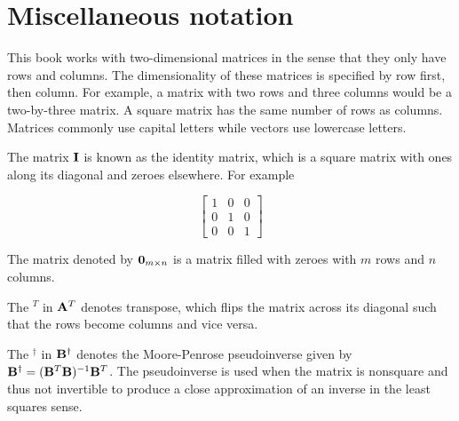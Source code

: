 \section{Miscellaneous notation}

This book works with two-dimensional matrices in the sense that they only have
rows and columns. The dimensionality of these matrices is specified by row
first, then column. For example, a matrix with two rows and three columns would
be a two-by-three matrix. A square matrix has the same number of rows as
columns. Matrices commonly use capital letters while vectors use lowercase
letters.

The matrix $\mathbf{I}$ is known as the identity matrix, which is a square matrix
with ones along its diagonal and zeroes elsewhere. For example

\begin{equation*}
  \begin{bmatrix}
    1 & 0 & 0 \\
    0 & 1 & 0 \\
    0 & 0 & 1
  \end{bmatrix}
\end{equation*}

The matrix denoted by $\mathbf{0}_{m \times n}$ is a matrix filled with zeroes with
$m$ rows and $n$ columns.

The $^T$ in $\mathbf{A}^T$ denotes transpose, which flips the matrix across its
diagonal such that the rows become columns and vice versa.

The $^\dagger$ in $\mathbf{B}^\dagger$ denotes the Moore-Penrose pseudoinverse
given by $\mathbf{B}^\dagger = (\mathbf{B}^T\mathbf{B})^{-1}\mathbf{B}^T$. The pseudoinverse
is used when the matrix is nonsquare and thus not invertible to produce a close
approximation of an inverse in the least squares sense.
